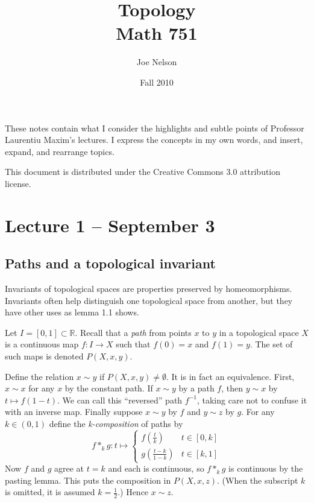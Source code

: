 \documentclass[letterpaper]{article}
\begin{document}
\title{Topology\\
Math 751}
\author{Joe Nelson}
\date{Fall 2010}
\maketitle

These notes contain what I consider the highlights and subtle points of Professor Laurentiu Maxim's lectures. I express the concepts in my own words, and insert, expand, and rearrange topics.

This document is distributed under the Creative Commons 3.0 attribution license.

\section{Lecture 1 -- September 3}

\subsection{Paths and a topological invariant}

Invariants of topological spaces are properties preserved by homeomorphisms. Invariants often help distinguish one topological space from another, but they have other uses as lemma 1.1 shows.

Let $I = [0, 1] \subset \mathbb{R}$. Recall that a \emph{path} from points $x$ to $y$ in a topological space $X$ is a continuous map $f \colon I \rightarrow X$ such that $f(0) = x$ and $f(1) = y$. The set of such maps is denoted $P(X, x, y)$.

Define the relation $x \sim y$ if $P(X, x, y) \ne \emptyset$. It is in fact an equivalence. First, $x \sim x$ for any $x$ by the constant path. If $x \sim y$ by a path $f$, then $y \sim x$ by $t \mapsto f(1-t)$. We can call this ``reversed'' path $f^{-1}$, taking care not to confuse it with an inverse map. Finally suppose $x \sim y$ by $f$ and $y \sim z$ by $g$. For any $k \in (0, 1)$ define the \emph{k-composition} of paths by
\[ f \ast_k g \colon t \mapsto
   \left\{
     \begin{array}{lr}
       f(\frac{t}{k}) & t \in [0, k]\\
       g(\frac{t-k}{1-k}) & t \in [k, 1]
     \end{array}
   \right.
\]
Now $f$ and $g$ agree at $t = k$ and each is continuous, so $f \ast_k g$ is continuous by the pasting lemma. This puts the composition in $P(X, x, z)$. (When the subscript $k$ is omitted, it is assumed $k = \frac{1}{2}$.) Hence $x \sim z$.
\end{document}
